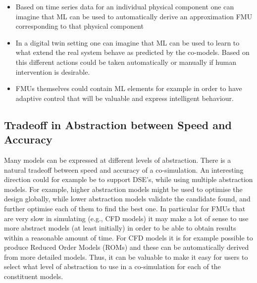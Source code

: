 \begin{itemize}
\item Based on time series data for an individual physical component one can imagine that ML can be used to automatically derive an approximation FMU corresponding to that physical component
\item In a digital twin setting one can imagine that ML can be used to learn to what extend the real system behave as predicted by the co-models. Based on this different actions could be taken automatically or manually if human intervention is desirable.
\item FMUs themselves could contain ML elements for example in order to have adaptive control that will be valuable and express intelligent behaviour.
\end{itemize}


\subsection{Tradeoff in Abstraction between Speed and Accuracy}

Many models can be expressed at different levels of abstraction. There is a natural tradeoff between speed and accuracy of a co-simulation. 
An interesting direction could for example be to support DSE's, while using multiple abstraction models.
For example, higher abstraction models might be used to optimise the design globally, while lower abstraction models validate the candidate found, and further optimise each of them to find the best one. In particular for FMUs that are very slow in simulating (e.g., CFD models) it may make a lot of sense to use more abstract models (at least initially) in order to be able to obtain results within a reasonable amount of time. For CFD models it is for example possible to produce Reduced Order Models (ROMs) and these can be automatically derived from more detailed models. Thus, it can be valuable to make it easy for users to select what level of abstraction to use in a co-simulation for each of the constituent models.

